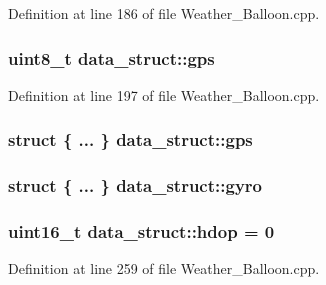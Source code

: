 Definition at line 186 of file Weather\+\_\+\+Balloon.\+cpp.

\subsubsection[{\texorpdfstring{gps}{gps}}]{\setlength{\rightskip}{0pt plus 5cm}uint8\+\_\+t data\+\_\+struct\+::gps}\hypertarget{structdata__struct_a7624f81e27eedfa09a247bd710e3ac9e}{}\label{structdata__struct_a7624f81e27eedfa09a247bd710e3ac9e}


Definition at line 197 of file Weather\+\_\+\+Balloon.\+cpp.

\subsubsection[{\texorpdfstring{gps}{gps}}]{\setlength{\rightskip}{0pt plus 5cm}struct \{ ... \}   data\+\_\+struct\+::gps}\hypertarget{structdata__struct_adc9fc98fd00ac000fde2f2a4e7c2094d}{}\label{structdata__struct_adc9fc98fd00ac000fde2f2a4e7c2094d}
\subsubsection[{\texorpdfstring{gyro}{gyro}}]{\setlength{\rightskip}{0pt plus 5cm}struct \{ ... \}   data\+\_\+struct\+::gyro}\hypertarget{structdata__struct_abda148daacfe93267bf35e5a7ab18c23}{}\label{structdata__struct_abda148daacfe93267bf35e5a7ab18c23}
\subsubsection[{\texorpdfstring{hdop}{hdop}}]{\setlength{\rightskip}{0pt plus 5cm}uint16\+\_\+t data\+\_\+struct\+::hdop = 0}\hypertarget{structdata__struct_ad4345066983e4b5b6c2e81287aff545f}{}\label{structdata__struct_ad4345066983e4b5b6c2e81287aff545f}


Definition at line 259 of file Weather\+\_\+\+Balloon.\+cpp.

